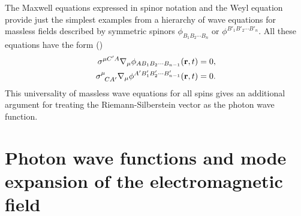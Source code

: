 \documentclass{article}
\begin{document}
The Maxwell equations expressed in spinor notation and the Weyl equation
provide just the simplest examples from a hierarchy of wave equations for
massless fields described by symmetric spinors $\phi_{B_1 B_2 \cdots B_n}$
or $\phi^{B'_1 B'_2 \cdots B'_n}$. All these equations have the form
(\cite{PR_84})
\begin{eqnarray}
\sigma^{\mu C'A}\nabla_\mu\phi_{AB_1 B_2 \cdots B_{n-1}}({\bf r},t) = 0,\\
\sigma^\mu_{\;\;CA'}\nabla_\mu\phi^{A'B'_1 B'_2 \cdots B'_{n-1}}({\bf r},t)
 = 0.
\end{eqnarray}
This universality of massless wave equations for all spins gives an
additional argument for treating the Riemann-Silberstein vector as the
photon wave function.

\section[WAVE FUNCTIONS AND MODE EXPANSION]{Photon wave functions and mode
expansion of the electromagnetic field\label{mode}}
\end{document}
